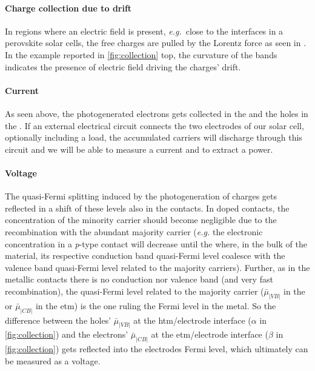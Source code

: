		\paragraph{Charge collection due to drift}
		In regions where an electric field is present, \textsl{e.g.}\ close to the interfaces in a perovskite solar cells, the free charges are pulled by the Lorentz force as seen in .
		In the example reported in \cref{fig:collection} top, the curvature of the bands indicates the presence of electric field driving the charges' drift.

		\paragraph{Current}
		As seen above, the photogenerated electrons gets collected in the  and the holes in the .
		If an external electrical circuit connects the two electrodes of our solar cell, optionally including a load, the accumulated carriers will discharge through this circuit and we will be able to measure a current and to extract a power.

		\paragraph{Voltage}
		The quasi-Fermi splitting induced by the photogeneration of charges gets reflected in a shift of these levels also in the contacts.
		In doped contacts, the concentration of the minority carrier should become negligible due to the recombination with the abundant majority carrier (\textsl{e.g.} the electronic concentration in a \textit{p}-type contact will decrease until the where, in the bulk of the material, its respective conduction band quasi-Fermi level coalesce with the valence band quasi-Fermi level related to the majority carriers).
		Further, as in the metallic contacts there is no conduction nor valence band (and very fast recombination), the quasi\hyp{}Fermi level related to the majority carrier ($\bar\mu_|VB|$ in the  or $\bar\mu_|CB|$ in the \gls{etm}) is the one ruling the Fermi level in the metal.
		So the difference between the holes' $\bar\mu_|VB|$ at the \gls{htm}/electrode interface ($\alpha$ in \cref{fig:collection}) and the electrons' $\bar\mu_|CB|$ at the \gls{etm}/electrode interface ($\beta$ in \cref{fig:collection}) gets reflected into the electrodes Fermi level, which ultimately can be measured as a voltage.


